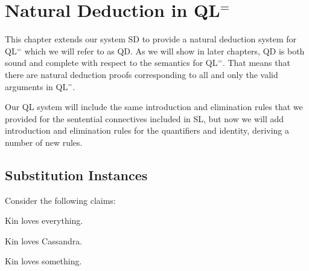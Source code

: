 ﻿%
\chapter{Natural Deduction in QL$^=$}
\label{ch.QLND}



This chapter extends our system SD to provide a natural deduction system for QL$^=$ which we will refer to as QD.
As we will show in later chapters, QD is both sound and complete with respect to the semantics for QL$^=$.
That means that there are natural deduction proofs corresponding to all and only the valid arguments in QL$^=$.

Our QL system will include the same introduction and elimination rules that we provided for the sentential connectives included in SL, but now we will add introduction and elimination rules for the quantifiers and identity, deriving a number of new rules.



\section{Substitution Instances}


Consider the following claims:

\begin{earg}
  \item[\ex{I1}] Kin loves everything.
  \item[\ex{I2}] Kin loves Cassandra.
  \item[\ex{I3}] Kin loves something.
\end{earg}

